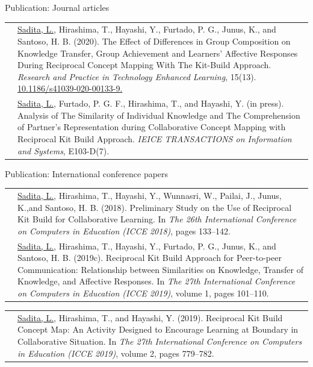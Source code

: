     

\begin{frame}{Publication: Journal articles}
\begin{tabular}{p{15mm}p{80mm}}
    \tiny{\color{blue}{RPTEL 2020}} & {\small \underline{Sadita,  L.},  Hirashima,  T.,  Hayashi,  Y.,  Furtado,  P.  G.,  Junus,  K.,  and Santoso,  H.  B.  (2020).   The  Effect  of  Differences  in  Group  Composition on Knowledge Transfer, Group Achievement and Learners' Affective Responses During Reciprocal Concept Mapping With The Kit-Build Approach. \textit{Research and Practice in Technology Enhanced Learning}, 15(13).  \href{https://doi.org/10.1186/s41039-020-00133-9}{10.1186/s41039-020-00133-9.}}\\
    \tiny{\color{blue}{IEICE 2020}} & {\small\underline{Sadita, L.}, Furtado, P. G. F., Hirashima, T., and Hayashi, Y. (in press). Analysis of The Similarity of Individual Knowledge and The Comprehension of Partner’s Representation during Collaborative Concept Mapping with Reciprocal Kit Build Approach. \textit{IEICE  TRANSACTIONS  on Information and Systems}, E103-D(7)}. 
\end{tabular}
\end{frame}

\begin{frame}[allowframebreaks]{Publication: International conference papers}
\begin{tabular}{p{15mm}p{80mm}}
    \tiny{\color{blue}{ICCE 2018}} & {\small\underline{Sadita, L.}, Hirashima, T., Hayashi, Y., Wunnasri, W., Pailai, J., Junus, K.,and Santoso, H. B. (2018). Preliminary Study on the Use of Reciprocal Kit Build for Collaborative Learning.  In \textit{The  26th  International  Conference on Computers in Education (ICCE 2018)}, pages 133–142.}\\
    
    \tiny{\color{blue}{ICCE 2019}} & {\small \underline{Sadita,  L.},  Hirashima,  T.,  Hayashi,  Y.,  Furtado,  P.  G.,  Junus,  K.,  and Santoso, H. B. (2019c).  Reciprocal Kit Build Approach for Peer-to-peer Communication:  Relationship between Similarities on Knowledge, Transfer  of  Knowledge,  and  Affective  Responses. In \textit{The  27th International Conference  on  Computers  in  Education  (ICCE  2019)},  volume  1,  pages 101–110.}\\
\end{tabular}

\begin{tabular}{p{15mm}p{80mm}}
    \tiny{\color{blue}{ICCE-DSC 2019}} & {\small \underline{Sadita, L.}, Hirashima, T., and Hayashi, Y. (2019).  Reciprocal Kit Build Concept Map:  An Activity Designed to Encourage Learning at Boundary in Collaborative Situation.  In \textit{The 27th International Conference on Computers in Education (ICCE 2019)}, volume 2, pages 779–782.}
\end{tabular}
\end{frame}

